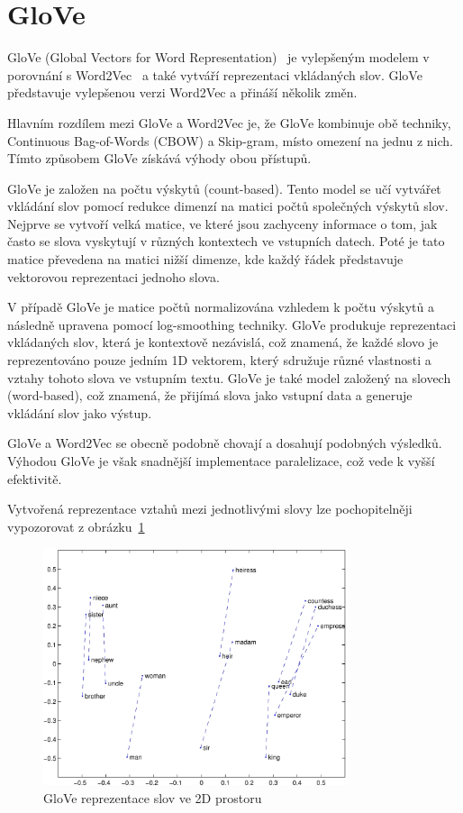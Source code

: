 \section{GloVe}
GloVe (Global Vectors for Word Representation)~\cite{link18} je vylepšeným modelem v porovnání s Word2Vec~\cite{link6} a také vytváří reprezentaci vkládaných slov.
GloVe představuje vylepšenou verzi Word2Vec a přináší několik změn.

Hlavním rozdílem mezi GloVe a Word2Vec je, že GloVe kombinuje obě techniky, Continuous Bag-of-Words (CBOW) a Skip-gram, místo omezení na jednu z nich.
Tímto způsobem GloVe získává výhody obou přístupů.

GloVe je založen na počtu výskytů (count-based).
Tento model se učí vytvářet vkládání slov pomocí redukce dimenzí na matici počtů společných výskytů slov.
Nejprve se vytvoří velká matice, ve které jsou zachyceny informace o tom, jak často se slova vyskytují v různých kontextech ve vstupních datech.
Poté je tato matice převedena na matici nižší dimenze, kde každý řádek představuje vektorovou reprezentaci jednoho slova.

V případě GloVe je matice počtů normalizována vzhledem k počtu výskytů a následně upravena pomocí log-smoothing techniky. GloVe produkuje reprezentaci vkládaných slov, která je kontextově nezávislá, což znamená, že každé slovo je reprezentováno pouze jedním 1D vektorem, který sdružuje různé vlastnosti a vztahy tohoto slova ve vstupním textu. GloVe je také model založený na slovech (word-based), což znamená, že přijímá slova jako vstupní data a generuje vkládání slov jako výstup.

GloVe a Word2Vec se obecně podobně chovají a dosahují podobných výsledků. Výhodou GloVe je však snadnější implementace paralelizace, což vede k vyšší efektivitě.

Vytvořená reprezentace vztahů mezi jednotlivými slovy lze pochopitelněji vypozorovat z obrázku~\ref{fig:GloVe reprezentace slov ve 2D prostoru} 
\begin{figure}[H]
	\centering
	\includegraphics[width=0.8\textwidth]{Figures/GloVe_representation.jpg}
	\caption{GloVe reprezentace slov ve 2D prostoru~\cite{link18}}\label{fig:GloVe reprezentace slov ve 2D prostoru}
\end{figure}

